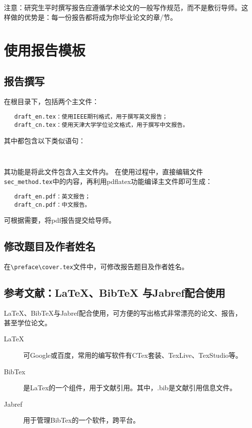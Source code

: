 
\textcolor[rgb]{0.00,0.07,1.00}{注意：研究生平时撰写报告应遵循学术论文的一般写作规范，而不是敷衍导师。这样做的优势是：每一份报告都将成为你毕业论文的章/节。
}
\section{使用报告模板}
\subsection{报告撰写}

在根目录下，包括两个主文件：
\begin{verbatim}
   draft_en.tex：使用IEEE期刊格式，用于撰写英文报告；
   draft_cn.tex：使用天津大学学位论文格式，用于撰写中文报告。
\end{verbatim}

其中都包含以下类似语句：

\begin{verbatim}
  
\end{verbatim}

其功能是将此文件包含入主文件内。
在使用过程中，直接编辑文件\verb+sec_method.tex+中的内容，再利用pdflatex功能编译主文件即可生成：
\begin{verbatim}
   draft_en.pdf：英文报告；
   draft_cn.pdf：中文报告。
\end{verbatim}

可根据需要，将pdf报告提交给导师。

\subsection{修改题目及作者姓名}

在\verb+\preface\cover.tex+文件中，可修改报告题目及作者姓名。

\subsection{参考文献：\LaTeX、BibTeX 与Jabref配合使用}


\LaTeX 、BibTeX与Jabref配合使用，可方便的写出格式非常漂亮的论文、报告，甚至学位论文。

\begin{description}
  \item[\LaTeX] 可Google或百度，常用的编写软件有CTex套装、TexLive、TexStudio等。
  \item[BibTex] 是LaTex的一个组件，用于文献引用。其中，.bib是文献引用信息文件。
  \item[Jabref] 用于管理BibTex的一个软件，跨平台。
\end{description}

